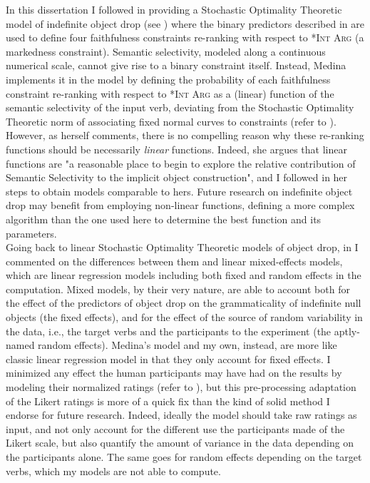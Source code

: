 In this dissertation I followed \textcite{Medina2007} in providing a Stochastic Optimality Theoretic model of indefinite object drop (see ) where the binary predictors described in  are used to define four faithfulness constraints re-ranking with respect to \textsc{*Int Arg} (a markedness constraint). Semantic selectivity, modeled along a continuous numerical scale, cannot give rise to a binary constraint itself. Instead, Medina implements it in the model by defining the probability of each faithfulness constraint re-ranking with respect to \textsc{*Int Arg} as a (linear) function of the semantic selectivity of the input verb, deviating from the Stochastic Optimality Theoretic norm of associating fixed normal curves to constraints (refer to ). However, as \textcite[110]{Medina2007} herself comments, there is no compelling reason why these re-ranking functions should be necessarily \textit{linear} functions. Indeed, she argues that linear functions are "a reasonable place to begin to explore the relative contribution of
Semantic Selectivity to the implicit object construction", and I followed in her steps to obtain models comparable to hers. Future research on indefinite object drop may benefit from employing non-linear functions, defining a more complex algorithm than the one used here to determine the best function and its parameters.\\
Going back to linear Stochastic Optimality Theoretic models of object drop, in  I commented on the differences between them and linear mixed-effects models, which are linear regression models including both fixed and random effects in the computation. Mixed models, by their very nature, are able to account both for the effect of the predictors of object drop on the grammaticality of indefinite null objects (the fixed effects), and for the effect of the source of random variability in the data, i.e., the target verbs and the participants to the experiment (the aptly-named random effects). Medina's model and my own, instead, are more like classic linear regression model in that they only account for fixed effects. I minimized any effect the human participants may have had on the results by modeling their normalized ratings (refer to ), but this pre-processing adaptation of the Likert ratings is more of a quick fix than the kind of solid method I endorse for future research. Indeed, ideally the model should take raw ratings as input, and not only account for the different use the participants made of the Likert scale, but also quantify the amount of variance in the data depending on the participants alone. The same goes for random effects depending on the target verbs, which my models are not able to compute.

